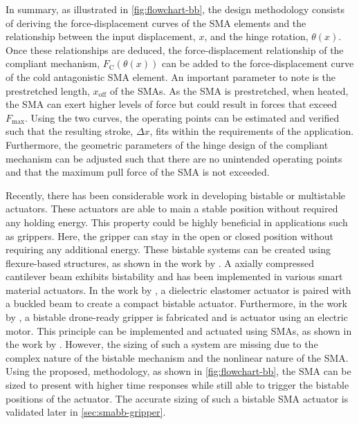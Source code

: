 In summary, as illustrated in \cref{fig:flowchart-bb}, the design methodology consists of deriving the force-displacement curves of the SMA elements and the relationship between the input displacement, $x$, and the hinge rotation, $\theta(x)$. Once these relationships are deduced, the force-displacement relationship of the compliant mechanism, $F_\mathrm{C}(\theta(x))$ can be added to the force-displacement curve of the cold antagonistic SMA element. An important parameter to note is the prestretched length, $x_\mathrm{off}$ of the SMAs. As the SMA is prestretched, when heated, the SMA can exert higher levels of force but could result in forces that exceed $F_\mathrm{max}$. Using the two curves, the operating points can be estimated and verified such that the resulting stroke, $\Delta x$, fits within the requirements of the application. Furthermore, the geometric parameters of the hinge design of the compliant mechanism can be adjusted such that there are no unintended operating points and that the maximum pull force of the SMA is not exceeded.


Recently, there has been considerable work in developing bistable or multistable actuators. These actuators are able to main a stable position without required any holding energy. This property could be highly beneficial in applications such as grippers. Here, the gripper can stay in the open or closed position without requiring any additional energy. These bistable systems can be created using flexure-based structures, as shown in the work by \cite{jinqiuCurvedbeamBistableMechanism2004}. A axially compressed cantilever beam exhibits bistability and has been implemented in various smart material actuators. In the work by \cite{chouinardBistableAntagonisticDielectric2012}, a dielectric elastomer actuator is paired with a buckled beam to create a compact bistable actuator. Furthermore, in the work by \cite{zhangCompliantBistableGrippers2020}, a bistable drone-ready gripper is fabricated and is actuator using an electric motor. This principle can be implemented and actuated using SMAs, as shown in the work by \cite{welschVacuumGripperSystem2018}. However, the sizing of such a system are missing due to the complex nature of the bistable mechanism and the nonlinear nature of the SMA. Using the proposed, methodology, as shown in \cref{fig:flowchart-bb}, the SMA can be sized to present with higher time responses while still able to trigger the bistable positions of the actuator. The accurate sizing of such a bistable SMA actuator is validated later in \cref{sec:smabb-gripper}.

